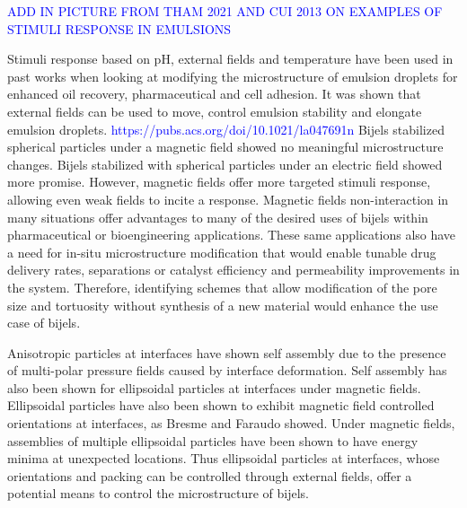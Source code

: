\textcolor{blue}{ADD IN PICTURE FROM THAM 2021 AND CUI 2013 ON EXAMPLES OF STIMULI RESPONSE IN EMULSIONS}

Stimuli response based on pH, external fields and temperature have been used in past works when looking at modifying the microstructure of 
emulsion droplets for enhanced oil recovery, pharmaceutical and cell adhesion. \cite{haase_nanoparticle_2011, tham_magnetophoresis_2021, 
cui_stabilizing_2013, manfredini_limonene--water_2021}  It was shown that external fields can be used to move, control emulsion stability 
and elongate emulsion droplets. \cite{tham_magnetophoresis_2021, cui_stabilizing_2013} 
\textcolor{blue}{https://pubs.acs.org/doi/10.1021/la047691n} Bijels stabilized spherical particles under a magnetic field showed no 
meaningful microstructure changes. \cite{kim_bijels_2010} Bijels stabilized with spherical particles under an electric field showed 
more promise. \cite{carmack_tuning_2018} However, magnetic fields offer more targeted stimuli response, allowing even weak fields to 
incite a response. Magnetic fields non-interaction in many situations offer advantages to many of the desired uses of bijels within 
pharmaceutical or bioengineering applications. \cite{vanoli_bijels_2022, thorson_bijel-templated_2019, thorson_composite_2018} These 
same applications also have a need for in-situ microstructure modification that would enable tunable drug delivery rates, separations or
 catalyst efficiency and permeability improvements in the system. Therefore, identifying schemes that allow modification of the pore size 
 and tortuosity  without synthesis of a new material would enhance the use case of bijels. 

Anisotropic particles at interfaces have shown self assembly due to the presence of multi-polar pressure fields caused by interface deformation. 
Self assembly has also been shown for ellipsoidal particles at interfaces under magnetic fields. Ellipsoidal particles have also been shown to 
exhibit magnetic field controlled orientations at interfaces, as Bresme and Faraudo showed. \cite{bresme_orientational_2007, davies_interface_2014}
 Under magnetic fields, assemblies of multiple ellipsoidal particles have been shown to have energy minima at unexpected locations. 
 \cite{newton_influence_2014, newton_capillary_2018} Thus ellipsoidal particles at interfaces, whose orientations and packing can be 
 controlled through external fields, offer a potential means to control the microstructure of bijels.

